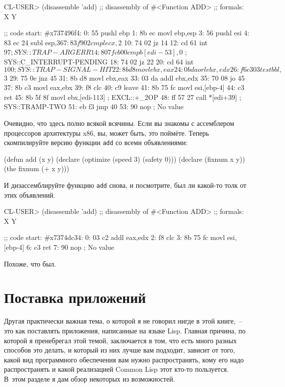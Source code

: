 \begin{myverb}
CL-USER> (disassemble 'add)
;; disassembly of #<Function ADD>
;; formals: X Y

;; code start: #x737496f4:
   0: 55         pushl	ebp
   1: 8b ec    movl	ebp,esp
   3: 56         pushl	esi
   4: 83 ec 24 subl	esp,$36
   7: 83 f9 02 cmpl	ecx,$2
  10: 74 02    jz	14
  12: cd 61    int	$97   ; SYS::TRAP-ARGERR
  14: 80 7f cb 00 cmpb	[edi-53],$0        ; SYS::C_INTERRUPT-PENDING
  18: 74 02    jz	22
  20: cd 64    int	$100  ; SYS::TRAP-SIGNAL-HIT
  22: 8b d8    movl	ebx,eax
  24: 0b da    orl	ebx,edx
  26: f6 c3 03 testb	bl,$3
  29: 75 0e    jnz	45
  31: 8b d8    movl	ebx,eax
  33: 03 da    addl	ebx,edx
  35: 70 08    jo	45
  37: 8b c3    movl	eax,ebx
  39: f8         clc
  40: c9         leave
  41: 8b 75 fc movl	esi,[ebp-4]
  44: c3         ret
  45: 8b 5f 8f movl	ebx,[edi-113]    ; EXCL::+_2OP
  48: ff 57 27 call	*[edi+39]   ; SYS::TRAMP-TWO
  51: eb f3    jmp	40
  53: 90         nop
; No value
\end{myverb}

Очевидно, что здесь полно всякой всячины. Если вы знакомы с ассемблером процессоров
архитектуры x86, вы, может быть, это поймёте. Теперь скомпилируйте версию функции \lstinline{add}
со всеми объявлениями:

\begin{myverb}
(defun add (x y)
  (declare (optimize (speed 3) (safety 0)))
  (declare (fixnum x y))
  (the fixnum (+ x y)))
\end{myverb}

И дизассемблируйте функцию \lstinline{add} снова, и посмотрите, был ли какой-то толк от
этих объявлений.

\begin{myverb}
CL-USER> (disassemble 'add)
;; disassembly of #<Function ADD>
;; formals: X Y

;; code start: #x7374dc34:
   0: 03 c2    addl	eax,edx
   2: f8         clc
   3: 8b 75 fc movl	esi,[ebp-4]
   6: c3         ret
   7: 90         nop
; No value
\end{myverb}

Похоже, что был.

\section{Поставка приложений}

Другая практически важная тема, о которой я не говорил нигде в этой книге,~-- это как
поставлять приложения, написанные на языке Lisp. Главная причина, по которой я пренебрегал
этой темой, заключается в том, что есть много разных способов это делать, и который из них
лучше вам подходит, зависит от того, какой вид программного обеспечения вам нужно
распространять, кому его надо распространять и какой реализацией Common Lisp этот кто-то
пользуется. В~этом разделе я дам обзор некоторых из возможностей.

